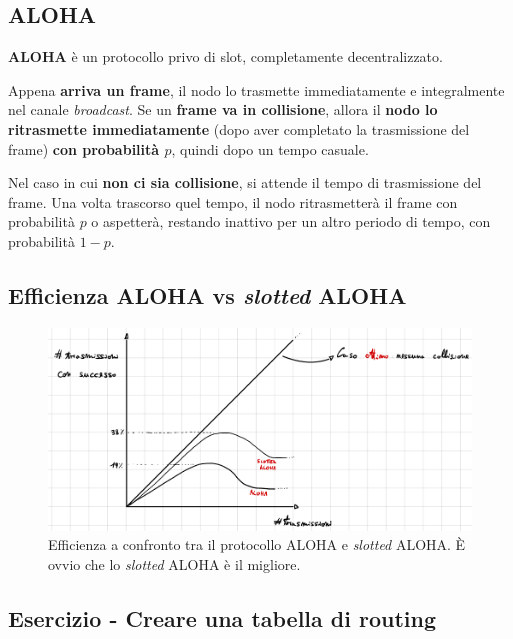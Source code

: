\documentclass[a4paper]{article}
\begin{document}
	\subsection{ALOHA}
	
	\textcolor{Red3}{\textbf{ALOHA}} è un protocollo privo di slot, completamente decentralizzato.\newline
	
	\noindent
	Appena \textbf{arriva un frame}, il nodo lo trasmette immediatamente e integralmente nel canale \emph{broadcast}. Se un \textbf{frame va in collisione}, allora il \textbf{nodo lo ritrasmette immediatamente} (dopo aver completato la trasmissione del frame) \textbf{con probabilità $p$}, quindi dopo un tempo casuale.\newline
	
	\noindent
	Nel caso in cui \textbf{non ci sia collisione}, si attende il tempo di trasmissione del frame. Una volta trascorso quel tempo, il nodo ritrasmetterà il frame con probabilità $p$ o aspetterà, restando inattivo per un altro periodo di tempo, con probabilità $1-p$.\newpage
	
	\subsection{Efficienza ALOHA vs \emph{slotted} ALOHA}
	
	\begin{figure}[!htp]
		\centering
		\includegraphics[width=\textwidth]{img/efficienza_aloha_vs_slotted.pdf}
		\caption{Efficienza a confronto tra il protocollo ALOHA e \emph{slotted} ALOHA. È ovvio che lo \emph{slotted} ALOHA è il migliore.}
	\end{figure}

	\subsection{\textcolor{Red3}{Esercizio - Creare una tabella di routing}}
	
\end{document}
